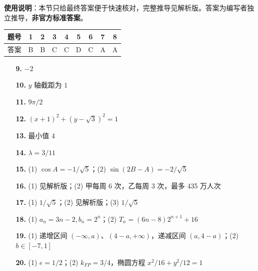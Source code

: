 
\begin{gknotice}
\textbf{使用说明}：本节只给最终答案便于快速核对，完整推导见解析版。答案为编写者独立推导，\textbf{非官方标准答案}。
\end{gknotice}

\begin{center}\begin{tabular}{ccccccccc}
\toprule
题号 & 1 & 2 & 3 & 4 & 5 & 6 & 7 & 8 \\
\midrule
答案 & B & B & C & C & D & C & A & A \\
\bottomrule
\end{tabular}\end{center}

\begin{itemize}[leftmargin=2.6em]
  \item[\textbf{9.}] $-2$
  \item[\textbf{10.}] $y$ 轴截距为 $1$
  \item[\textbf{11.}] $9\pi/2$
  \item[\textbf{12.}] $(x+1)^2+(y-\sqrt3)^2=1$
  \item[\textbf{13.}] 最小值 $4$
  \item[\textbf{14.}] $\lambda=3/11$
\end{itemize}

\begin{itemize}[leftmargin=2.6em]
  \item[\textbf{15.}] (1) $\cos A=-1/\sqrt5$；(2) $\sin(2B-A)=-2/\sqrt5$
  \item[\textbf{16.}] (1) 见解析版；(2) 甲每周 6 次，乙每周 3 次，最多 435 万人次
  \item[\textbf{17.}] (1) $1/\sqrt5$；(2) 见解析版；(3) $1/\sqrt5$
  \item[\textbf{18.}] (1) $a_n=3n-2,b_n=2^n$；(2) $T_n=(6n-8)2^{n+1}+16$
  \item[\textbf{19.}] (1) 递增区间 $(-\infty,a)$、$(4-a,+\infty)$，递减区间 $(a,4-a)$；(2) $b\in[-7,1]$
  \item[\textbf{20.}] (1) $e=1/2$；(2) $k_{FP}=3/4$，椭圆方程 $x^2/16+y^2/12=1$
\end{itemize}
